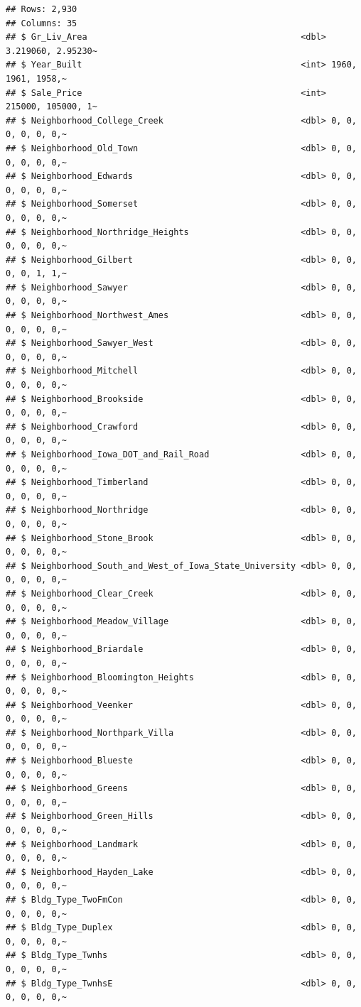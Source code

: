 \documentclass[
]{book}
\begin{document}
\begin{verbatim}
## Rows: 2,930
## Columns: 35
## $ Gr_Liv_Area                                          <dbl> 3.219060, 2.95230~
## $ Year_Built                                           <int> 1960, 1961, 1958,~
## $ Sale_Price                                           <int> 215000, 105000, 1~
## $ Neighborhood_College_Creek                           <dbl> 0, 0, 0, 0, 0, 0,~
## $ Neighborhood_Old_Town                                <dbl> 0, 0, 0, 0, 0, 0,~
## $ Neighborhood_Edwards                                 <dbl> 0, 0, 0, 0, 0, 0,~
## $ Neighborhood_Somerset                                <dbl> 0, 0, 0, 0, 0, 0,~
## $ Neighborhood_Northridge_Heights                      <dbl> 0, 0, 0, 0, 0, 0,~
## $ Neighborhood_Gilbert                                 <dbl> 0, 0, 0, 0, 1, 1,~
## $ Neighborhood_Sawyer                                  <dbl> 0, 0, 0, 0, 0, 0,~
## $ Neighborhood_Northwest_Ames                          <dbl> 0, 0, 0, 0, 0, 0,~
## $ Neighborhood_Sawyer_West                             <dbl> 0, 0, 0, 0, 0, 0,~
## $ Neighborhood_Mitchell                                <dbl> 0, 0, 0, 0, 0, 0,~
## $ Neighborhood_Brookside                               <dbl> 0, 0, 0, 0, 0, 0,~
## $ Neighborhood_Crawford                                <dbl> 0, 0, 0, 0, 0, 0,~
## $ Neighborhood_Iowa_DOT_and_Rail_Road                  <dbl> 0, 0, 0, 0, 0, 0,~
## $ Neighborhood_Timberland                              <dbl> 0, 0, 0, 0, 0, 0,~
## $ Neighborhood_Northridge                              <dbl> 0, 0, 0, 0, 0, 0,~
## $ Neighborhood_Stone_Brook                             <dbl> 0, 0, 0, 0, 0, 0,~
## $ Neighborhood_South_and_West_of_Iowa_State_University <dbl> 0, 0, 0, 0, 0, 0,~
## $ Neighborhood_Clear_Creek                             <dbl> 0, 0, 0, 0, 0, 0,~
## $ Neighborhood_Meadow_Village                          <dbl> 0, 0, 0, 0, 0, 0,~
## $ Neighborhood_Briardale                               <dbl> 0, 0, 0, 0, 0, 0,~
## $ Neighborhood_Bloomington_Heights                     <dbl> 0, 0, 0, 0, 0, 0,~
## $ Neighborhood_Veenker                                 <dbl> 0, 0, 0, 0, 0, 0,~
## $ Neighborhood_Northpark_Villa                         <dbl> 0, 0, 0, 0, 0, 0,~
## $ Neighborhood_Blueste                                 <dbl> 0, 0, 0, 0, 0, 0,~
## $ Neighborhood_Greens                                  <dbl> 0, 0, 0, 0, 0, 0,~
## $ Neighborhood_Green_Hills                             <dbl> 0, 0, 0, 0, 0, 0,~
## $ Neighborhood_Landmark                                <dbl> 0, 0, 0, 0, 0, 0,~
## $ Neighborhood_Hayden_Lake                             <dbl> 0, 0, 0, 0, 0, 0,~
## $ Bldg_Type_TwoFmCon                                   <dbl> 0, 0, 0, 0, 0, 0,~
## $ Bldg_Type_Duplex                                     <dbl> 0, 0, 0, 0, 0, 0,~
## $ Bldg_Type_Twnhs                                      <dbl> 0, 0, 0, 0, 0, 0,~
## $ Bldg_Type_TwnhsE                                     <dbl> 0, 0, 0, 0, 0, 0,~
\end{verbatim}
\end{document}
